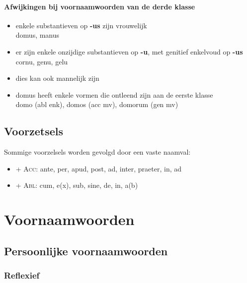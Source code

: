 \documentclass[12pt,a4paper]{article}
\begin{document}
\paragraph{Afwijkingen bij voornaamwoorden van de derde klasse}
\begin{itemize}
    \item enkele substantieven op \textbf{-us} zijn vrouwelijk \\
        domus, manus
    \item er zijn enkele onzijdige substantieven op \textbf{-u}, met genitief enkelvoud op \textbf{-us} \\
        cornu, genu, gelu
    \item dies kan ook mannelijk zijn
    \item domus heeft enkele vormen die ontleend zijn aan de eerste klasse \\
        domo (abl enk), domos (acc mv), domorum (gen mv)
\end{itemize}



\subsection{Voorzetsels}
Sommige voorzelsels worden gevolgd door een vaste naamval:
\begin{itemize}
    \item + \textsc{Acc}: ante, per, apud, post, ad, inter, praeter, in, ad
    \item + \textsc{Abl}: cum, e(x), sub, sine, de, in, a(b)
\end{itemize}

\section{Voornaamwoorden}

\subsection{Persoonlijke voornaamwoorden}

\subsubsection{Reflexief}
\end{document}
